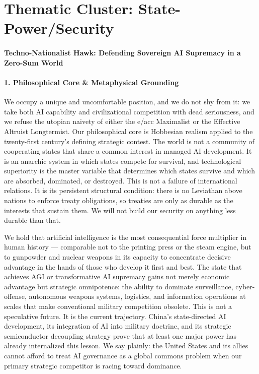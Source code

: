\section{Thematic Cluster:
State-Power/Security}\label{thematic-cluster-state-powersecurity}

\paragraph{Techno-Nationalist Hawk: Defending Sovereign AI Supremacy in
a Zero-Sum
World}\label{techno-nationalist-hawk-defending-sovereign-ai-supremacy-in-a-zero-sum-world}

\paragraph{1. Philosophical Core \& Metaphysical
Grounding}\label{philosophical-core-metaphysical-grounding-21}

We occupy a unique and uncomfortable position, and we do not shy from
it: we take both AI capability and civilizational competition with dead
seriousness, and we refuse the utopian naivety of either the e/acc
Maximalist or the Effective Altruist Longtermist. Our philosophical core
is Hobbesian realism applied to the twenty-first century's defining
strategic contest. The world is not a community of cooperating states
that share a common interest in managed AI development. It is an
anarchic system in which states compete for survival, and technological
superiority is the master variable that determines which states survive
and which are absorbed, dominated, or destroyed. This is not a failure
of international relations. It is its persistent structural condition:
there is no Leviathan above nations to enforce treaty obligations, so
treaties are only as durable as the interests that sustain them. We will
not build our security on anything less durable than that.

We hold that artificial intelligence is the most consequential force
multiplier in human history --- comparable not to the printing press or
the steam engine, but to gunpowder and nuclear weapons in its capacity
to concentrate decisive advantage in the hands of those who develop it
first and best. The state that achieves AGI or transformative AI
supremacy gains not merely economic advantage but strategic omnipotence:
the ability to dominate surveillance, cyber-offense, autonomous weapons
systems, logistics, and information operations at scales that make
conventional military competition obsolete. This is not a speculative
future. It is the current trajectory. China's state-directed AI
development, its integration of AI into military doctrine, and its
strategic semiconductor decoupling strategy prove that at least one
major power has already internalized this lesson. We say plainly: the
United States and its allies cannot afford to treat AI governance as a
global commons problem when our primary strategic competitor is racing
toward dominance.

